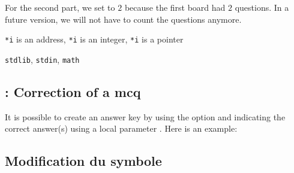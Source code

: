 For the second part, we set  to $2$ because the first board had $2$ questions. In a future version, we will not have to count the questions anymore.

\begin{tkzltxexample}[small]
  \begin{alterqcm}[lq=80mm,title=false,num=false,numbreak=2,long]
  {{\texttt{*i} is an address},
   {\texttt{*i} is an integer},
   {\texttt{*i} is a pointer}}

  {{\texttt{stdlib}},
   {\texttt{stdin}},
   {\texttt{math}}}
  \end{alterqcm}
\end{tkzltxexample}

\subsection{ : Correction of a mcq}

 It is possible to create an answer key by using the  option and indicating the correct answer(s) using a local parameter .
 Here is an example:

 \begin{alterqcm}[VF,lq=125mm,correction,
                  symb    = \dingsquare,
                  corsymb = \dingchecksquare]
 \AQquestion[br=1]{For all $x \in ]-3~;~2],~f'(x) \geqslant 0$.}
 \end{alterqcm}

 \begin{tkzltxexample}[]
  \begin{alterqcm}[VF,lq=125mm,correction,
                   symb    = \dingsquare,
                   corsymb = \dingchecksquare]
  \AQquestion[br=1]{For all $x \in ]-3~;~2],~f'(x) \geqslant 0$.}
  \end{alterqcm}
\end{tkzltxexample}

\subsection{Modification du symbole }

